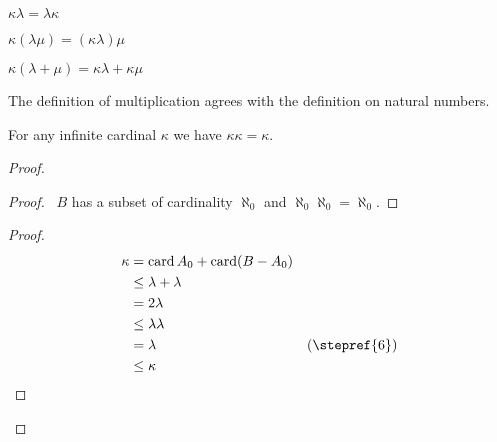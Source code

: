 \begin{theorem}
    $\kappa \lambda = \lambda \kappa$
\end{theorem}

\begin{theorem}
    $\kappa (\lambda \mu) = (\kappa \lambda) \mu$
\end{theorem}

\begin{theorem}
    $\kappa (\lambda + \mu) = \kappa \lambda + \kappa \mu$
\end{theorem}

\begin{theorem}
    The definition of multiplication agrees with the definition on natural numbers.
\end{theorem}

\begin{theorem}[AC]
    For any infinite cardinal $\kappa$ we have $\kappa \kappa = \kappa$.
\end{theorem}

\begin{proof}
    \pf
    \begin{proof}
        \pf\ $B$ has a subset of cardinality $\aleph_0$ and $\aleph_0 \aleph_0 = \aleph_0$.
    \end{proof}
    \begin{proof}
        \pf
        \begin{align*}
            \kappa & = \card A_0 + \card (B - A_0) \\
            & \leq \lambda + \lambda \\
            & = 2 \lambda \\
            & \leq \lambda \lambda \\
            & = \lambda & (\text{\stepref{6}}) \\
            & \leq \kappa & \qed
        \end{align*}
    \end{proof}
\end{proof}

